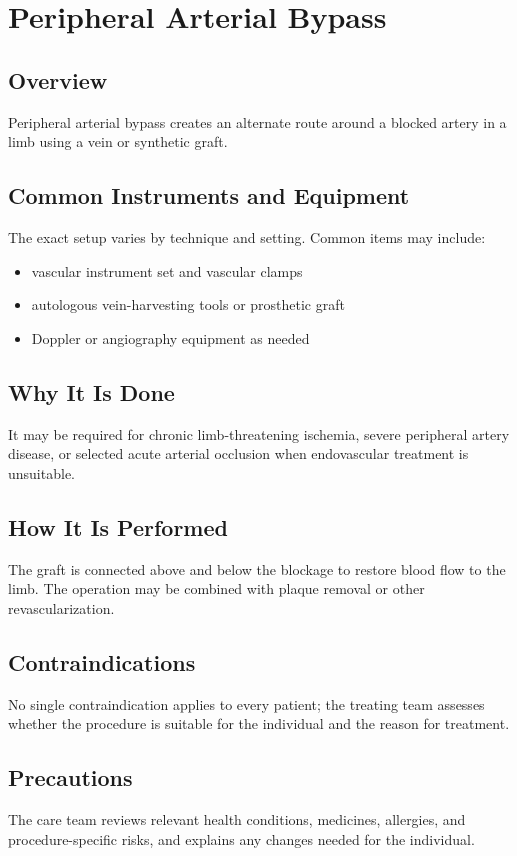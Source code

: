 \chapter{Peripheral Arterial Bypass}
\section*{Overview}
Peripheral arterial bypass creates an alternate route around a blocked artery in a limb using a vein or synthetic graft.
\section*{Common Instruments and Equipment}
The exact setup varies by technique and setting. Common items may include:
\begin{itemize}[nosep,leftmargin=*]
  \item vascular instrument set and vascular clamps
  \item autologous vein-harvesting tools or prosthetic graft
  \item Doppler or angiography equipment as needed
\end{itemize}

\section*{Why It Is Done}
It may be required for chronic limb-threatening ischemia, severe peripheral artery disease, or selected acute arterial occlusion when endovascular treatment is unsuitable.
\section*{How It Is Performed}
The graft is connected above and below the blockage to restore blood flow to the limb. The operation may be combined with plaque removal or other revascularization.
\section*{Contraindications}
No single contraindication applies to every patient; the treating team assesses whether the procedure is suitable for the individual and the reason for treatment.

\section*{Precautions}
The care team reviews relevant health conditions, medicines, allergies, and procedure-specific risks, and explains any changes needed for the individual.

